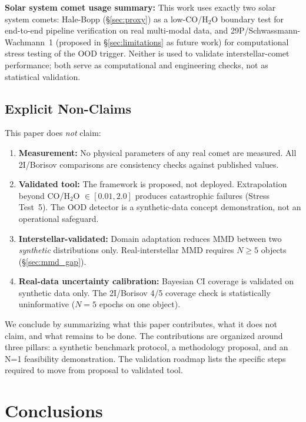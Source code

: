 \documentclass[usenatbib]{mnras}
\begin{document}
\textbf{Solar system comet usage summary:} This work uses exactly two solar system comets: Hale-Bopp (\S\ref{sec:proxy}) as a low-CO/H$_2$O boundary test for end-to-end pipeline verification on real multi-modal data, and 29P/Schwassmann-Wachmann~1 (proposed in \S\ref{sec:limitations} as future work) for computational stress testing of the OOD trigger. Neither is used to validate interstellar-comet performance; both serve as computational and engineering checks, not as statistical validation.

\subsection{Explicit Non-Claims}\label{sec:non_claims}

This paper does \textit{not} claim:

\begin{enumerate}
    \item \textbf{Measurement:} No physical parameters of any real comet are measured. All 2I/Borisov comparisons are consistency checks against published values.
    \item \textbf{Validated tool:} The framework is proposed, not deployed. Extrapolation beyond CO/H$_2$O $\in [0.01, 2.0]$ produces catastrophic failures (Stress Test~5). The OOD detector is a synthetic-data concept demonstration, not an operational safeguard.
    \item \textbf{Interstellar-validated:} Domain adaptation reduces MMD between two \textit{synthetic} distributions only. Real-interstellar MMD requires $N \geq 5$ objects (\S\ref{sec:mmd_gap}).
    \item \textbf{Real-data uncertainty calibration:} Bayesian CI coverage is validated on synthetic data only. The 2I/Borisov 4/5 coverage check is statistically uninformative ($N=5$ epochs on one object).
\end{enumerate}

We conclude by summarizing what this paper contributes, what it does not claim, and what remains to be done. The contributions are organized around three pillars: a synthetic benchmark protocol, a methodology proposal, and an N=1 feasibility demonstration. The validation roadmap lists the specific steps required to move from proposal to validated tool.

\section{Conclusions}\label{sec:conclusions}
\end{document}
